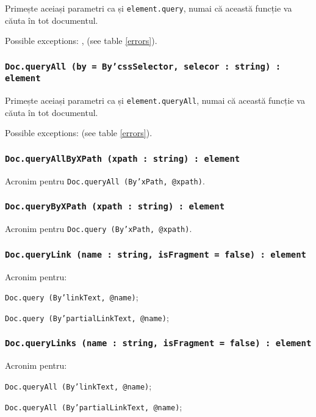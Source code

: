 Primește aceiași parametri ca și  \texttt{element.query}, numai că această funcție va căuta în tot documentul.

Possible exceptions: ,  (see table \ref{errors}).

\subsubsection{\texttt{Doc.queryAll (by = By'cssSelector, selecor : string) : element}}

Primește aceiași parametri ca și \texttt{element.queryAll}, numai că această funcție va căuta în tot documentul.

Possible exceptions:  (see table \ref{errors}).

\subsubsection{\texttt{Doc.queryAllByXPath (xpath : string) : element}}

Acronim pentru \texttt{Doc.queryAll (By'xPath, @xpath)}.

\subsubsection{\texttt{Doc.queryByXPath (xpath : string) : element}}

Acronim pentru \texttt{Doc.query (By'xPath, @xpath)}.

\subsubsection{\texttt{Doc.queryLink (name : string, isFragment = false) : element}}

Acronim pentru:
\begin{icItems}
	\item \texttt{Doc.query (By'linkText, @name)};
	\item \texttt{Doc.query (By'partialLinkText, @name)};
\end{icItems}

\subsubsection{\texttt{Doc.queryLinks (name : string, isFragment = false) : element}}

Acronim pentru:
\begin{icItems}
	\item \texttt{Doc.queryAll (By'linkText, @name)};
	\item \texttt{Doc.queryAll (By'partialLinkText, @name)};
\end{icItems}

